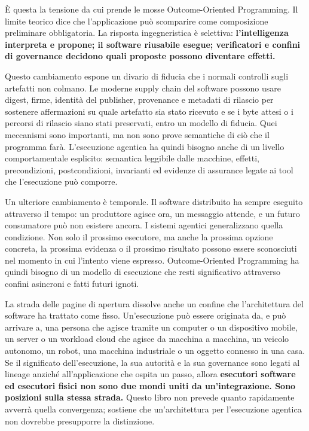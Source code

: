 \documentclass[10pt,oneside,openany]{book}
\begin{document}
È questa la tensione da cui prende le mosse Outcome-Oriented Programming. Il limite teorico dice che l'applicazione può scomparire come composizione preliminare obbligatoria. La risposta ingegneristica è selettiva: \textbf{l'intelligenza interpreta e propone; il software riusabile esegue; verificatori e confini di governance decidono quali proposte possono diventare effetti.}

Questo cambiamento espone un divario di fiducia che i normali controlli sugli artefatti non colmano. Le moderne supply chain del software possono usare digest, firme, identità del publisher, provenance e metadati di rilascio per sostenere affermazioni su quale artefatto sia stato ricevuto e se i byte attesi o i percorsi di rilascio siano stati preservati, entro un modello di fiducia. Quei meccanismi sono importanti, ma non sono prove semantiche di ciò che il programma farà. L'esecuzione agentica ha quindi bisogno anche di un livello comportamentale esplicito: semantica leggibile dalle macchine, effetti, precondizioni, postcondizioni, invarianti ed evidenze di assurance legate ai tool che l'esecuzione può comporre.

Un ulteriore cambiamento è temporale. Il software distribuito ha sempre eseguito attraverso il tempo: un produttore agisce ora, un messaggio attende, e un futuro consumatore può non esistere ancora. I sistemi agentici generalizzano quella condizione. Non solo il prossimo esecutore, ma anche la prossima opzione concreta, la prossima evidenza o il prossimo risultato possono essere sconosciuti nel momento in cui l'intento viene espresso. Outcome-Oriented Programming ha quindi bisogno di un modello di esecuzione che resti significativo attraverso confini asincroni e fatti futuri ignoti.

La strada delle pagine di apertura dissolve anche un confine che l'architettura del software ha trattato come fisso. Un'esecuzione può essere originata da, e può arrivare a, una persona che agisce tramite un computer o un dispositivo mobile, un server o un workload cloud che agisce da macchina a macchina, un veicolo autonomo, un robot, una macchina industriale o un oggetto connesso in una casa. Se il significato dell'esecuzione, la sua autorità e la sua governance sono legati al lineage anziché all'applicazione che ospita un passo, allora \textbf{esecutori software ed esecutori fisici non sono due mondi uniti da un'integrazione. Sono posizioni sulla stessa strada.} Questo libro non prevede quanto rapidamente avverrà quella convergenza; sostiene che un'architettura per l'esecuzione agentica non dovrebbe presupporre la distinzione.
\end{document}
